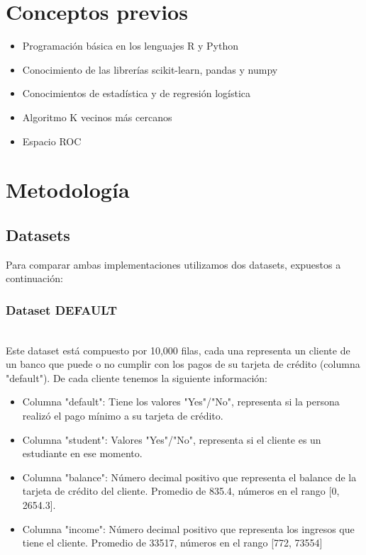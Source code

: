 \documentclass[sigconf,authorversion,nonacm]{acmart}
\begin{document}
\section{Conceptos previos}
\begin{itemize}
  \item Programación básica en los lenguajes R y Python
  \item Conocimiento de las librerías scikit-learn, pandas y numpy
  \item Conocimientos de estadística y de regresión logística
  \item Algoritmo K vecinos más cercanos
  \item Espacio ROC
\end{itemize}


\section{Metodología}

\subsection{Datasets}
Para comparar ambas implementaciones utilizamos dos datasets, expuestos a continuación:

\subsubsection{Dataset DEFAULT}\hfill\\
Este dataset está compuesto por 10,000 filas, cada una representa un cliente de un banco que puede o no cumplir con los pagos de su tarjeta de crédito (columna "default"). De cada cliente tenemos la siguiente información:
\begin{itemize}
  \item Columna "default": Tiene los valores "Yes"/"No", representa si la persona realizó el pago mínimo a su tarjeta de crédito.
  \item Columna "student": Valores "Yes"/"No", representa si el cliente es un estudiante en ese momento.
  \item Columna "balance": Número decimal positivo que representa el balance de la tarjeta de crédito del cliente. Promedio de 835.4, números en el rango [0, 2654.3].
  \item Columna "income": Número decimal positivo que representa los ingresos que tiene el cliente. Promedio de 33517, números en el rango [772, 73554]
\end{itemize}
\end{document}
